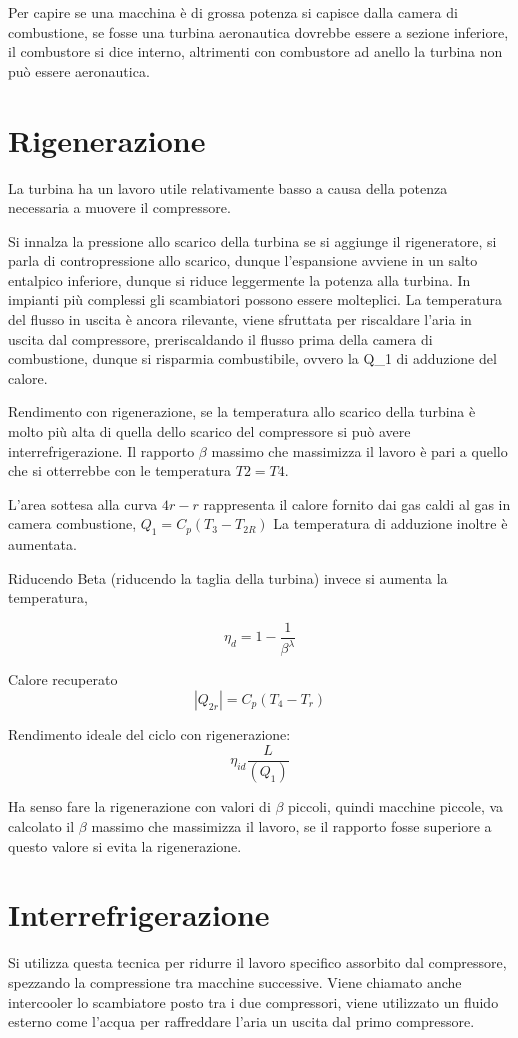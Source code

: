 
Per capire se una macchina è di grossa potenza si capisce dalla camera di
combustione, se fosse una turbina aeronautica dovrebbe essere a sezione
inferiore, il combustore si dice interno, altrimenti con combustore ad anello
la turbina non può essere aeronautica.

\section{Rigenerazione}
La turbina ha un lavoro utile relativamente basso a causa della potenza
necessaria a muovere il compressore.

Si innalza la pressione allo scarico della turbina se si aggiunge il
rigeneratore, si parla di contropressione allo scarico, dunque l'espansione
avviene in un salto entalpico inferiore, dunque si riduce leggermente la
potenza alla turbina. In impianti più complessi gli scambiatori possono essere
molteplici.
La temperatura del flusso in uscita è ancora rilevante, viene sfruttata per
riscaldare l'aria in uscita dal compressore, preriscaldando il flusso prima
della camera di combustione, dunque si risparmia combustibile, ovvero la Q_1 di
adduzione del calore.

Rendimento con rigenerazione, se la temperatura allo scarico della turbina è
molto più alta di quella dello scarico del compressore si può avere
interrefrigerazione.
Il rapporto $\beta$ massimo che massimizza il lavoro è pari a quello che si
otterrebbe con le temperatura $T2=T4$.

L'area sottesa alla curva $4r-r$ rappresenta il calore fornito dai gas caldi al
gas in camera combustione,
$Q_1=C_p(T_3-T_{2R})$
La temperatura di adduzione inoltre è aumentata.



Riducendo Beta (riducendo la taglia della turbina) invece si aumenta la
temperatura,

$$
\eta_d = 1- \frac{1}{\beta^\lambda}
$$


Calore recuperato
$$
|Q_{2r}| = C_p(T_4-T_r)
$$


Rendimento ideale del ciclo con rigenerazione:
$$
\eta_{id} \frac{L}{(Q_1)}
$$

Ha senso fare la rigenerazione con valori di $\beta$ piccoli, quindi macchine
piccole, va calcolato il $\beta$ massimo che massimizza il lavoro, se il
rapporto fosse superiore a questo valore si evita la rigenerazione.



\section{Interrefrigerazione}
Si utilizza questa tecnica per ridurre il lavoro specifico assorbito dal
compressore, spezzando la compressione tra macchine successive.
Viene chiamato anche intercooler lo scambiatore posto tra i due compressori,
viene utilizzato un fluido esterno come l'acqua per raffreddare l'aria un
uscita dal primo compressore.

